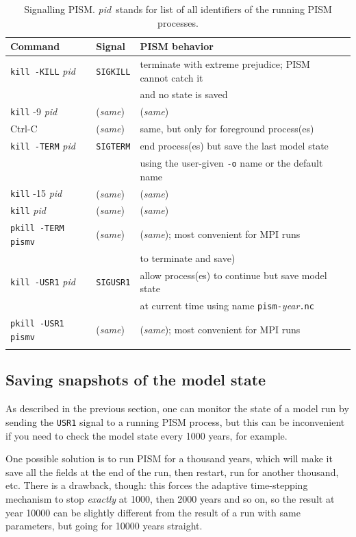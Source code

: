 \documentclass[11pt,final]{amsart}
\begin{document}
\newcommand\pid{\textsl{pid}}
\newcommand\same{(\textsl{same})}
\begin{table}[ht]
\caption{Signalling PISM.  \pid~stands for list of all identifiers of the running PISM processes.}\label{tab:signals}
\begin{tabular}{@{}llll}\hline
\textbf{Command}\phantom{bobbob} & \textbf{Signal}\phantom{bobbob} & \textbf{PISM behavior} \\ \hline
\texttt{kill -KILL} \pid & \texttt{SIGKILL} & terminate with extreme prejudice; PISM cannot catch it \\
 & & and no state is saved \\
\texttt{kill} -9 \pid & \same & \same \\
Ctrl-C & \same & same, but only for foreground process(es)  \\ \hline
\texttt{kill -TERM} \pid & \texttt{SIGTERM} & end process(es) but save the last model state \\
 &  & using the user-given \verb|-o| name or the default name \\
\texttt{kill} -15 \pid & \same & \same \\
\texttt{kill} \pid & \same & \same \\
\texttt{pkill -TERM pismv} & \same & \same; most convenient for MPI runs \\ 
 &  & to terminate and save) \\ \hline
\texttt{kill -USR1} \pid & \texttt{SIGUSR1} & allow process(es) to continue but save model state \\
 &  & at current time using name \texttt{pism-}\textsl{year}\texttt{.nc} \\
\texttt{pkill -USR1 pismv} & \same & \same; most convenient for MPI runs \\
\hline\normalsize
\end{tabular}
\end{table}

\subsection{Saving snapshots of the model state}
\label{sec:snapshots}

As described in the previous section, one can monitor the state of a model run
by sending the \verb|USR1| signal to a running PISM process, but this can be
inconvenient if you need to check the model state every 1000 years, for example.

One possible solution is to run PISM for a thousand years, which will make it
save all the fields at the end of the run, then restart, run for another
thousand, etc. There is a drawback, though: this forces the adaptive
time-stepping mechanism to stop \emph{exactly} at 1000, then 2000 years and so
on, so the result at year 10000 can be slightly different from the result of a
run with same parameters, but going for 10000 years straight.
\end{document}
